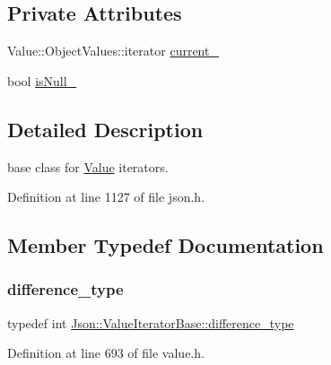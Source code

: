 \subsection*{Private Attributes}
\begin{DoxyCompactItemize}
\item 
Value\+::\+Object\+Values\+::iterator \hyperlink{class_json_1_1_value_iterator_base_ab3138ce8af8301cca3b041ea55cb922a}{current\+\_\+}
\item 
bool \hyperlink{class_json_1_1_value_iterator_base_a3e08b114a1aed9bde518c527f94a8c59}{is\+Null\+\_\+}
\end{DoxyCompactItemize}


\subsection{Detailed Description}
base class for \hyperlink{class_json_1_1_value}{Value} iterators. 



Definition at line 1127 of file json.\+h.



\subsection{Member Typedef Documentation}
\hypertarget{class_json_1_1_value_iterator_base_a4e44bf8cbd17ec8d6e2c185904a15ebd}{}\label{class_json_1_1_value_iterator_base_a4e44bf8cbd17ec8d6e2c185904a15ebd} 
\subsubsection{\texorpdfstring{difference\+\_\+type}{difference\_type}\hspace{0.1cm}{\footnotesize\ttfamily [1/2]}}
{\footnotesize\ttfamily typedef int \hyperlink{class_json_1_1_value_iterator_base_a4e44bf8cbd17ec8d6e2c185904a15ebd}{Json\+::\+Value\+Iterator\+Base\+::difference\+\_\+type}}



Definition at line 693 of file value.\+h.

\hypertarget{class_json_1_1_value_iterator_base_a4e44bf8cbd17ec8d6e2c185904a15ebd}{}\label{class_json_1_1_value_iterator_base_a4e44bf8cbd17ec8d6e2c185904a15ebd} 
